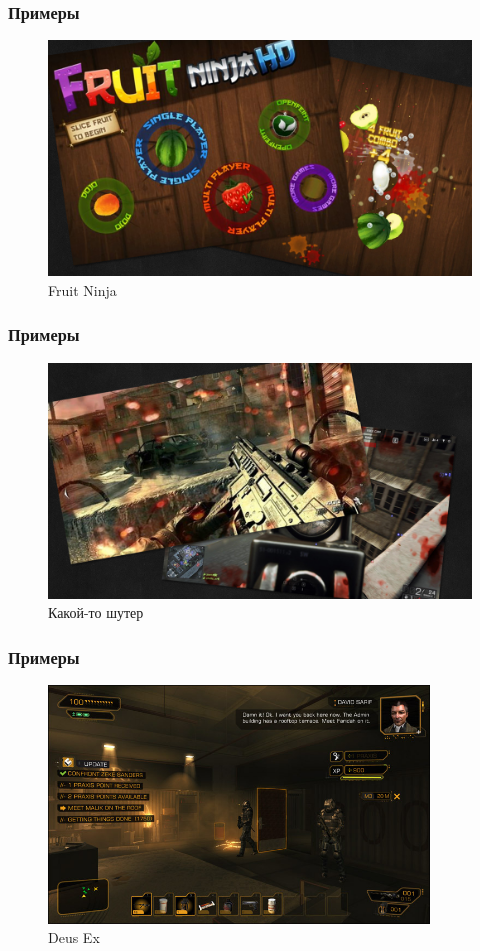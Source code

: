 \documentclass[10pt]{beamer}
\begin{document}
\begin{frame}
  \frametitle{Примеры}
  \centering
  \begin{figure}
    \includegraphics[width=\textwidth]{res/img/fruitNinja.png}
    \caption{Fruit Ninja}
  \end{figure}
\end{frame}

\begin{frame}
  \frametitle{Примеры}
  \centering
  \begin{figure}
    \includegraphics[width=\textwidth]{res/img/shooter.png}
    \caption{Какой-то шутер}
  \end{figure}
\end{frame}

\begin{frame}
  \frametitle{Примеры}
  \centering
  \begin{figure}
    \includegraphics[width=0.9\textwidth]{res/img/deusEx.jpg}
    \caption{Deus Ex}
  \end{figure}
\end{frame}
\end{document}
